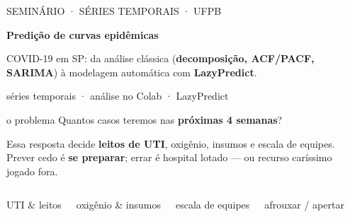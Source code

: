 \documentclass[aspectratio=169,11pt]{beamer}
\newcommand{\dest}[1]{\textcolor{emph}{\textbf{#1}}}
\newcommand{\bom}[1]{\textcolor{verde}{\textbf{#1}}}
\begin{document}
\begin{frame}[plain]
  \vfill
  \begin{center}
    {\scriptsize\ttfamily\color{clight} SEMINÁRIO · SÉRIES TEMPORAIS · UFPB}\\[0.7em]
    \begin{tcolorbox}[enhanced,colback=white,opacityback=0.10,colframe=white,
        opacityframe=0.32,arc=6mm,width=0.86\paperwidth,halign=center,top=5mm,bottom=5mm,center]
      {\ttfamily\bfseries\fontsize{30}{34}\selectfont Predição de curvas epidêmicas}
    \end{tcolorbox}
    \vspace{0.6em}
    {\normalsize COVID-19 em SP: da análise clássica (\bom{decomposição, ACF/PACF, SARIMA})
     à modelagem automática com \dest{LazyPredict}.}\\[0.8em]
    \begin{tcolorbox}[alertbox,width=0.5\paperwidth,halign=center,valign=center]
      {\ttfamily\small séries temporais · análise no Colab · LazyPredict}
    \end{tcolorbox}
  \end{center}
  \vfill
  {\centering\color{clight}{\footnotesize\ttfamily Allan Vasconcelos · UFPB · 2026}\par}
  \vspace{0.5em}
\end{frame}

\begin{frame}{o problema}
  \vspace{0.3em}
  {\Large Quantos casos teremos nas \dest{próximas 4 semanas}?}
  \vspace{0.7em}

  Essa resposta decide \dest{leitos de UTI}, oxigênio, insumos e escala de equipes.
  Prever cedo é \bom{se preparar}; errar é hospital lotado — ou recurso caríssimo jogado fora.
  \vspace{0.8em}
  \begin{columns}[c]
    \begin{tcolorbox}[pitchbox,halign=center]\footnotesize UTI \& leitos\end{tcolorbox}
    \begin{tcolorbox}[pitchbox,halign=center]\footnotesize oxigênio \& insumos\end{tcolorbox}
    \begin{tcolorbox}[pitchbox,halign=center]\footnotesize escala de equipes\end{tcolorbox}
    \begin{tcolorbox}[pitchbox,halign=center]\footnotesize afrouxar / apertar\end{tcolorbox}
  \end{columns}
\end{frame}
\end{document}
